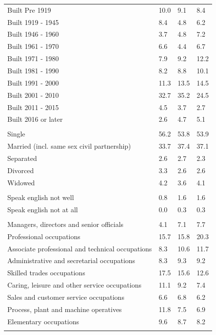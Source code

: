 \documentclass{article}
\begin{document}
\begin{table}[h]
\begin{tabular}{KTTT}
    \hline
Built Pre 1919 & 10.0&  9.1&  8.4\\
Built 1919 - 1945 & 8.4& 4.8& 6.2\\
Built  1946 - 1960 & 3.7& 4.8& 7.2\\
Built  1961 - 1970 & 6.6& 4.4& 6.7\\
Built  1971 - 1980 &  7.9&  9.2& 12.2\\
Built  1981 - 1990 &  8.2&  8.8& 10.1\\
Built  1991 - 2000 & 11.3& 13.5& 14.5\\
Built  2001 - 2010 & 32.7& 35.2& 24.5\\
Built  2011 - 2015 & 4.5& 3.7& 2.7\\
Built  2016 or later & 2.6& 4.7& 5.1\\
\hline
    \\
    \hline
Single & 56.2& 53.8& 53.9\\
Married (incl. same sex civil partnership) & 33.7& 37.4& 37.1\\
Separated  & 2.6& 2.7& 2.3\\
Divorced  & 3.3& 2.6& 2.6\\
Widowed & 4.2& 3.6& 4.1\\
\hline
    \\ 
    \hline
Speak english not well & 0.8& 1.6& 1.6\\
Speak english not at all & 0.0& 0.3& 0.3\\
\hline
    \\
    \hline
Managers, directors and senior officials & 4.1& 7.1& 7.7\\
Professional occupations & 15.7& 15.8& 20.3\\
Associate professional and technical occupations &  8.3& 10.6& 11.7\\
Administrative and secretarial occupations & 8.3& 9.3& 9.2\\
Skilled trades occupations & 17.5& 15.6& 12.6\\
Caring, leisure and other service occupations & 11.1&  9.2&  7.4\\
Sales and customer service occupations & 6.6& 6.8& 6.2\\
Process, plant and machine operatives & 11.8&  7.5&  6.9\\
Elementary occupations & 9.6& 8.7& 8.2\\
\hline
\end{tabular}
\end{table}
\end{document}
